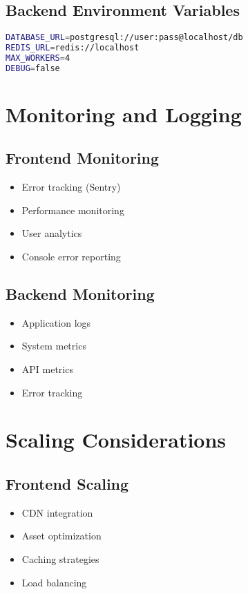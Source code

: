 \subsection{Backend Environment Variables}
\begin{lstlisting}[language=bash]
DATABASE_URL=postgresql://user:pass@localhost/db
REDIS_URL=redis://localhost
MAX_WORKERS=4
DEBUG=false
\end{lstlisting}

\section{Monitoring and Logging}
\subsection{Frontend Monitoring}
\begin{itemize}
    \item Error tracking (Sentry)
    \item Performance monitoring
    \item User analytics
    \item Console error reporting
\end{itemize}

\subsection{Backend Monitoring}
\begin{itemize}
    \item Application logs
    \item System metrics
    \item API metrics
    \item Error tracking
\end{itemize}

\section{Scaling Considerations}
\subsection{Frontend Scaling}
\begin{itemize}
    \item CDN integration
    \item Asset optimization
    \item Caching strategies
    \item Load balancing
\end{itemize}

